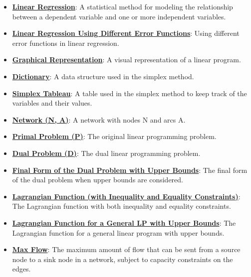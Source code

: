\documentclass{article}%
\begin{document}
\begin{itemize}[leftmargin=*]
\item \href{https://www.math.purdue.edu/~yipn/421/2024-11-14-NetAppls.pdf#page=7}{\textbf{Linear Regression}}: A statistical method for modeling the relationship between a dependent variable and one or more independent variables.%
\item \href{https://www.math.purdue.edu/~yipn/421/2024-11-14-NetAppls.pdf#page=7}{\textbf{Linear Regression Using Different Error Functions}}: Using different error functions in linear regression.%
\item \href{https://www.math.purdue.edu/~yipn/421/2024-11-14-NetAppls.pdf#page=7}{\textbf{Graphical Representation}}: A visual representation of a linear program.%
\item \href{https://www.math.purdue.edu/~yipn/421/2024-11-14-NetAppls.pdf#page=7}{\textbf{Dictionary}}: A data structure used in the simplex method.%
\item \href{https://www.math.purdue.edu/~yipn/421/2024-11-14-NetAppls.pdf#page=7}{\textbf{Simplex Tableau}}: A table used in the simplex method to keep track of the variables and their values.%
\item \href{https://www.math.purdue.edu/~yipn/421/2024-11-14-NetAppls.pdf#page=7}{\textbf{Network (N, A)}}: A network with nodes N and arcs A.%
\item \href{https://www.math.purdue.edu/~yipn/421/2024-11-14-NetAppls.pdf#page=7}{\textbf{Primal Problem (P)}}: The original linear programming problem.%
\item \href{https://www.math.purdue.edu/~yipn/421/2024-11-14-NetAppls.pdf#page=7}{\textbf{Dual Problem (D)}}: The dual linear programming problem.%
\item \href{https://www.math.purdue.edu/~yipn/421/2024-11-14-NetAppls.pdf#page=7}{\textbf{Final Form of the Dual Problem with Upper Bounds}}: The final form of the dual problem when upper bounds are considered.%
\item \href{https://www.math.purdue.edu/~yipn/421/2024-11-14-NetAppls.pdf#page=7}{\textbf{Lagrangian Function (with Inequality and Equality Constraints)}}: The Lagrangian function with both inequality and equality constraints.%
\item \href{https://www.math.purdue.edu/~yipn/421/2024-11-14-NetAppls.pdf#page=7}{\textbf{Lagrangian Function for a General LP with Upper Bounds}}: The Lagrangian function for a general linear program with upper bounds.%
\item \href{https://www.math.purdue.edu/~yipn/421/2024-11-19-MaxFlowMinCut.pdf#page=1}{\textbf{Max Flow}}: The maximum amount of flow that can be sent from a source node to a sink node in a network, subject to capacity constraints on the edges. %

\end{itemize}
\end{document}
